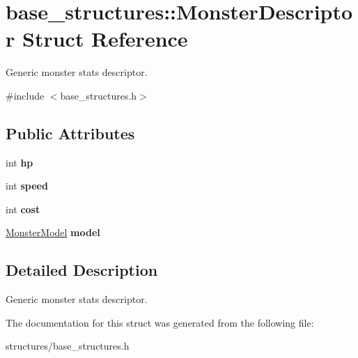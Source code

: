 \hypertarget{structbase__structures_1_1MonsterDescriptor}{}\section{base\+\_\+structures\+:\+:Monster\+Descriptor Struct Reference}
\label{structbase__structures_1_1MonsterDescriptor}


Generic monster stats descriptor.  




{\ttfamily \#include $<$base\+\_\+structures.\+h$>$}

\subsection*{Public Attributes}
\begin{DoxyCompactItemize}
\item 
\mbox{\label{structbase__structures_1_1MonsterDescriptor_af0bb52f8614a6b01ff8692070b7e5c4c}} 
int {\bfseries hp}
\item 
\mbox{\label{structbase__structures_1_1MonsterDescriptor_a2184a3644529de7bcdc2a372812c75c2}} 
int {\bfseries speed}
\item 
\mbox{\label{structbase__structures_1_1MonsterDescriptor_a391ab537de749f260aa08d04ccb7b5ae}} 
int {\bfseries cost}
\item 
\mbox{\label{structbase__structures_1_1MonsterDescriptor_a774d9c5c2030e2166082bb00550dae40}} 
\hyperlink{group__monster__interface_ga92d84ad7c1ff9ec724366d3b4d0de044}{Monster\+Model} {\bfseries model}
\end{DoxyCompactItemize}


\subsection{Detailed Description}
Generic monster stats descriptor. 

The documentation for this struct was generated from the following file\+:\begin{DoxyCompactItemize}
\item 
structures/base\+\_\+structures.\+h\end{DoxyCompactItemize}
